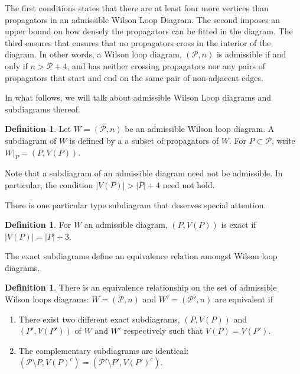 \documentclass[11pt]{article}
\newcommand{\cP}{\mathcal{P}}
\theoremstyle{remark}
\theoremstyle{definition}
\newtheorem{dfn}[thm]{Definition}
\begin{document}
The first conditions states that there are at least four more vertices than propagators in an admissible Wilson Loop Diagram. The second imposes an upper bound on how densely the propagators can be fitted in the diagram. The third ensures that ensures that no propagators cross in the interior of the diagram. In other words, a Wilson loop diagram, $(\cP, n)$ is admissible if and only if $n > \cP +4$, and has neither crossing propagators nor any pairs of propagators that start and end on the same pair of non-adjacent edges.

In what follows, we will talk about admissible Wilson Loop diagrams and subdiagrams thereof.

\begin{dfn} \label{subdiagramdfn}
Let $W = (\cP, n)$ be an admissible Wilson loop diagram. A subdiagram of $W$ is defined by a a subset of propagators of $W$. For $P \subset \cP$, write $W|_P = (P, V(P))$.
\end{dfn}

Note that a subdiagram of an admissible diagram need not be admissible. In particular, the condition $|V(P)| > |P| +4$ need not hold.

There is one particular type subdiagram that deserves special attention.

\begin{dfn}
For $W$ an admissible diagram, $(P, V(P))$ is exact if $|V(P)| = |P| + 3$.
\end{dfn}

The exact subdiagrams define an equivalence relation amongst Wilson loop diagrams.

\begin{dfn}\label{equivdfn}
There is an equivalence relationship on the set of admissible Wilson loops diagrams: $W = (\cP, n)$ and $W'= (\cP', n)$ are equivalent if
\begin{enumerate}
\item There exist two different exact subdiagrams, $(P, V(P))$ and $(P', V(P'))$ of $W$ and $W'$ respectively such that $V(P) =  V(P')$.
\item The complementary subdiagrams are identical: $(\cP \setminus P, V(P)^c) = (\cP' \setminus P', V(P')^c)$.
\end{enumerate}
\end{dfn}
\end{document}
